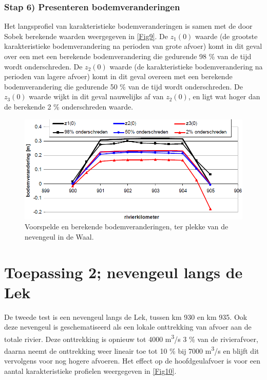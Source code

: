 \subsubsection*{Stap 6) Presenteren bodemveranderingen}

Het langsprofiel van karakteristieke bodemveranderingen is samen met de door Sobek berekende waarden weergegeven in \autoref{Fig9}.
De $z_1(0)$ waarde (de grootste karakteristieke bodemverandering na perioden van grote afvoer) komt in dit geval over een met een berekende bodemverandering die gedurende 98 \% van de tijd wordt onderschreden.
De $z_2(0)$ waarde (de karakteristieke bodemverandering na perioden van lagere afvoer) komt in dit geval overeen met een berekende bodemverandering die gedurende 50 \% van de tijd wordt onderschreden.
De $z_3(0)$ waarde wijkt in dit geval nauwelijks af van $z_2(0)$, en ligt wat hoger dan de berekende 2 \% onderschreden waarde.

\begin{figure}
\includegraphics[width=\columnwidth]{figures/Fig9.png}
\caption{Voorspelde en berekende bodemveranderingen, ter plekke van de nevengeul in de Waal.}
\label{Fig9}
\end{figure}

\section{Toepassing 2; nevengeul langs de Lek}

De tweede test is een nevengeul langs de Lek, tussen km 930 en km 935.
Ook deze nevengeul is geschematiseerd als een lokale onttrekking van afvoer aan de totale rivier.
Deze onttrekking is opnieuw tot 4000 m\textsuperscript{3}/s 3 \% van de rivierafvoer, daarna neemt de onttrekking weer lineair toe tot 10 \% bij 7000 m\textsuperscript{3}/s en blijft dit vervolgens voor nog hogere afvoeren.
Het effect op de hoofdgeulafvoer is voor een aantal karakteristieke profielen weergegeven in \autoref{Fig10}.


